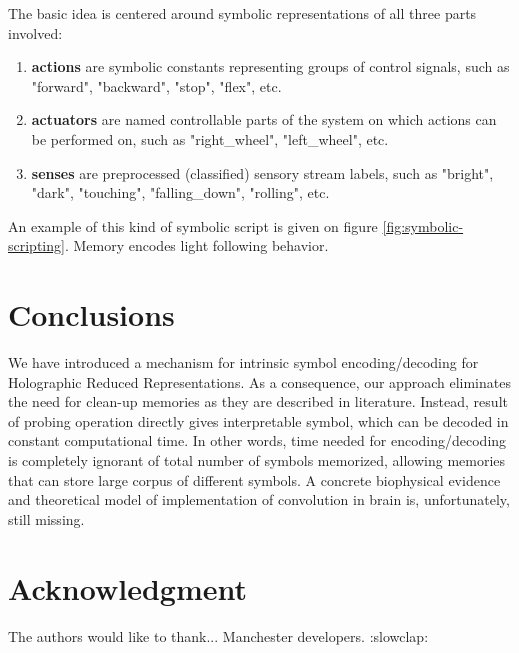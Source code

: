 \documentclass[conference]{IEEEtran}
\begin{document}
The basic idea is centered around symbolic representations of all three parts involved:
\begin{enumerate}
	\item \textbf{actions} are symbolic constants representing groups of control signals, such as "forward", "backward", "stop", "flex", etc.
	
	\item \textbf{actuators} are named controllable parts of the system on which actions can be performed on, such as "right\_wheel", "left\_wheel", etc.
	
	\item \textbf{senses} are preprocessed (classified) sensory stream labels, such as "bright", "dark", "touching", "falling\_down", "rolling", etc.
\end{enumerate}

An example of this kind of symbolic script is given on figure \ref{fig:symbolic-scripting}. Memory encodes light following behavior.

	\section{Conclusions}
	We have introduced a mechanism for intrinsic symbol encoding/decoding for Holographic Reduced Representations.
As a consequence, our approach eliminates the need for clean-up memories as they are described in literature.
Instead, result of probing operation directly gives interpretable symbol, which can be decoded in constant computational time.
In other words, time needed for encoding/decoding is completely ignorant of total number of symbols memorized, allowing memories that can store large corpus of different symbols.
	A concrete biophysical evidence and theoretical model of implementation of convolution in brain is, unfortunately, still missing.
	
	\section*{Acknowledgment}
	
	The authors would like to thank...
Manchester developers. :slowclap:
	
	\printbibliography[heading=bibintoc]
	
\end{document}
